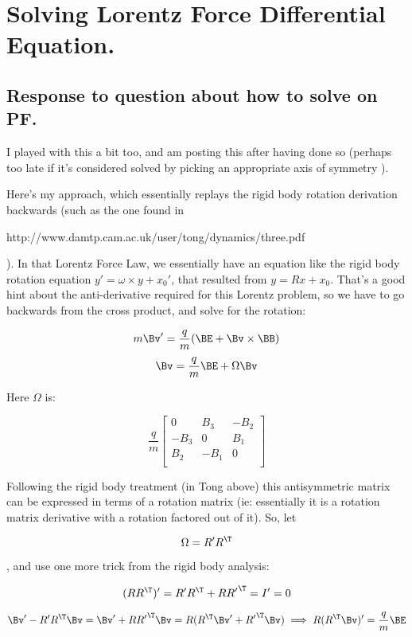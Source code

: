 \chapter{Solving Lorentz Force Differential Equation.}

\section{Response to question about how to solve on PF. }

I played with this a bit too, and am posting this after having done so (perhaps too late if it's considered solved by picking an appropriate axis of symmetry ).

Here's my approach, which essentially replays the rigid body rotation derivation backwards (such as the one found in 

http://www.damtp.cam.ac.uk/user/tong/dynamics/three.pdf

).  In that Lorentz Force Law, we essentially have an equation like the rigid body rotation equation $y' = \omega \times y + x_0'$, that resulted from $y = R x + x_0$.  That's a good hint about the anti-derivative required for this Lorentz problem, so we have to go backwards from the cross product, and solve for the rotation:
 
\[
m \Bv' = \frac{q}{m} ( \BE + \Bv \times \BB )
\]
\[
\Bv = \frac{q}{m} \BE + \Omega \Bv
\]

Here $\Omega$ is:

\[
\frac{q}{m}
\begin{bmatrix}
0 & B_3 & -B_2 \\
-B_3 & 0 & B_1 \\
B_2 & -B_1 & 0 \\
\end{bmatrix}
\]

Following the rigid body treatment (in Tong above) this antisymmetric matrix can be expressed in terms of a rotation matrix (ie: essentially it is a rotation matrix derivative with a rotation factored out of it).  So, let

\[
\Omega = R' R^\T
\]

, and use one more trick from the rigid body analysis:

\[
(RR^\T)' = R' R^\T + R {R'}^\T = I' = 0
\]

\[
\Bv' - R' R^\T \Bv = \Bv' + R {R'}^\T \Bv = R (R^\T \Bv' + {R'}^\T \Bv) 
\implies 
R (R^\T \Bv)' = \frac{q}{m} \BE
\]

